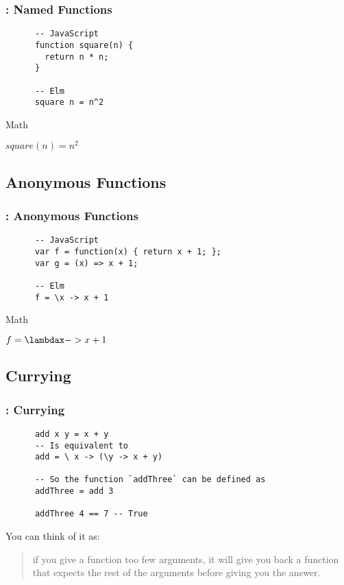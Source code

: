 \documentclass{beamer}
\begin{document}
\frame %

\begin{frame}[fragile]
  \frametitle{\insertsection: Named Functions}
\begin{lstlisting}
      -- JavaScript
      function square(n) {
        return n * n;
      }

      -- Elm
      square n = n^2
\end{lstlisting}

  \pause
  Math

  $square(n) = n^2$
\end{frame}

\subsection{Anonymous Functions}

\begin{frame}[fragile]
  \frametitle{\insertsection: Anonymous Functions}
\begin{lstlisting}
      -- JavaScript
      var f = function(x) { return x + 1; };
      var g = (x) => x + 1;

      -- Elm
      f = \x -> x + 1
\end{lstlisting}

  Math

  $f = \lambdax -> x + 1$

\end{frame}

\subsection{Currying}

\begin{frame}[fragile]
  \frametitle{\insertsection: Currying}

    \begin{lstlisting}
      add x y = x + y
      -- Is equivalent to
      add = \ x -> (\y -> x + y)

      -- So the function `addThree` can be defined as
      addThree = add 3

      addThree 4 == 7 -- True
    \end{lstlisting}


    \pause

    You can think of it as:

    \begin{quote}
      if you give a function too few arguments, it will give you back a function
      that expects the rest of the arguments before giving you the answer.
    \end{quote}
\end{frame}
\end{document}
